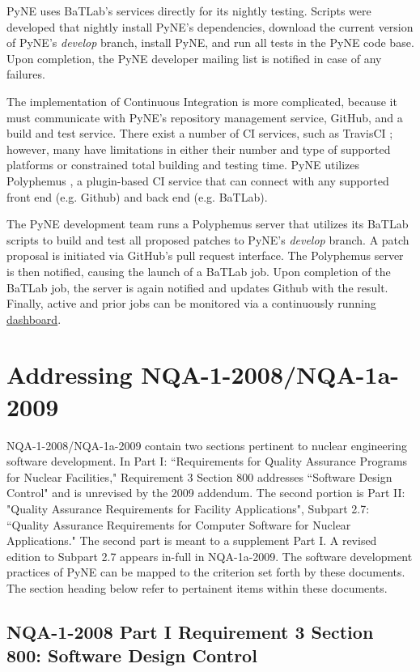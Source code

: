\documentclass{anstrans}
\begin{document}
PyNE uses BaTLab's services directly for its nightly testing. Scripts were
developed that nightly install PyNE's dependencies, download the current version
of PyNE's \textit{develop} branch, install PyNE, and run all tests in the PyNE
code base. Upon completion, the PyNE developer mailing list is notified in case of
any failures.

The implementation of Continuous Integration is more complicated, because it
must communicate with PyNE's repository management service, GitHub, and a build
and test service. There exist a number of CI services, such as TravisCI
\cite{travis_2014}; however, many have limitations in either their number and
type of supported platforms or constrained total building and testing time. PyNE
utilizes Polyphemus \cite{polyphemus_2014}, a plugin-based CI service that can
connect with any supported front end (e.g. Github) and back end (e.g. BaTLab).

The PyNE development team runs a Polyphemus server that utilizes its BaTLab
scripts to build and test all proposed patches to PyNE's \textit{develop}
branch. A patch proposal is initiated via GitHub's pull request
interface. The Polyphemus server is then notified, causing the launch of a
BaTLab job. Upon completion of the BaTLab job, the server is again notified and
updates Github with the result. Finally, active and prior jobs can be monitored
via a continuously running \href{http://gorgus.pyne.io/dashboard}{dashboard}.


\section{Addressing NQA-1-2008/NQA-1a-2009}

NQA-1-2008/NQA-1a-2009 contain two sections pertinent to nuclear engineering
software development. In Part I: ``Requirements for Quality Assurance Programs
for Nuclear Facilities," Requirement 3 Section 800 addresses ``Software Design
Control" and is unrevised by the 2009 addendum. The second portion is Part II:
"Quality Assurance Requirements for Facility Applications", Subpart 2.7:
``Quality Assurance Requirements for Computer Software for Nuclear
Applications." The second part is meant to a supplement Part I. A revised
edition to Subpart 2.7 appears in-full in NQA-1a-2009. The software development
practices of PyNE can be mapped to the criterion set forth by these documents.
The section heading below refer to pertainent items within these documents.

\subsection{NQA-1-2008 Part I Requirement 3 Section 800: Software Design Control}
\end{document}
